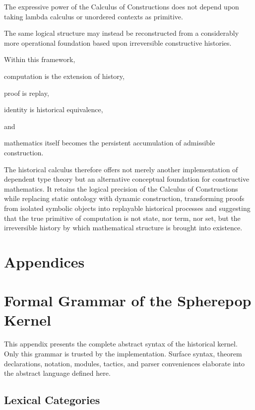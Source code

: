 \documentclass[12pt,oneside]{article}
\theoremstyle{definition}
\theoremstyle{remark}
\begin{document}
The expressive power of the Calculus of Constructions does not depend upon
taking lambda calculus or unordered contexts as primitive.

The same logical structure may instead be reconstructed from a considerably
more operational foundation based upon irreversible constructive histories.

Within this framework,

computation is the extension of history,

proof is replay,

identity is historical equivalence,

and

mathematics itself becomes the persistent accumulation of admissible
construction.

The historical calculus therefore offers not merely another implementation of
dependent type theory but an alternative conceptual foundation for constructive
mathematics. It retains the logical precision of the Calculus of Constructions
while replacing static ontology with dynamic construction, transforming proofs
from isolated symbolic objects into replayable historical processes and
suggesting that the true primitive of computation is not state, nor term, nor
set, but the irreversible history by which mathematical structure is brought
into existence.


\newpage 
\section*{Appendices}

\appendix

\section{Formal Grammar of the Spherepop Kernel}

This appendix presents the complete abstract syntax of the historical kernel.
Only this grammar is trusted by the implementation. Surface syntax, theorem
declarations, notation, modules, tactics, and parser conveniences elaborate into
the abstract language defined here.

\subsection{Lexical Categories}
\end{document}
